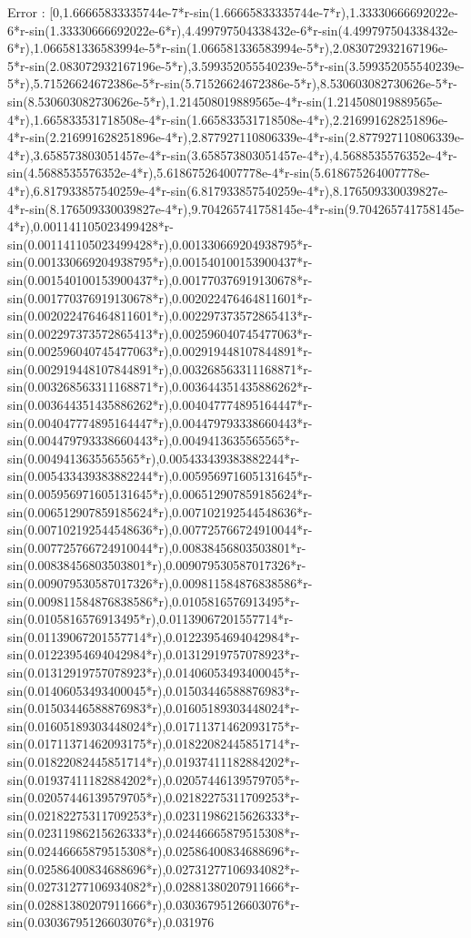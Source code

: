 \documentclass[a4paper,10pt]{article}
\begin{document}
\begin{eulernotebook}
\begin{eulercomment}
\begin{eulercomment}
\begin{eulercomment}
\begin{eulercomment}
\begin{eulercomment}
\begin{eulercomment}
\begin{eulercomment}
\begin{eulercomment}
\begin{eulercomment}
\begin{eulercomment}
\begin{eulercomment}
\begin{eulercomment}
\begin{eulercomment}
\begin{eulercomment}
\begin{eulercomment}
\begin{eulercomment}
\begin{eulercomment}
\begin{eulercomment}
\begin{eulercomment}
\begin{eulercomment}
\begin{euleroutput}
  Error : [0,1.66665833335744e-7*r-sin(1.66665833335744e-7*r),1.33330666692022e-6*r-sin(1.33330666692022e-6*r),4.499797504338432e-6*r-sin(4.499797504338432e-6*r),1.066581336583994e-5*r-sin(1.066581336583994e-5*r),2.083072932167196e-5*r-sin(2.083072932167196e-5*r),3.599352055540239e-5*r-sin(3.599352055540239e-5*r),5.71526624672386e-5*r-sin(5.71526624672386e-5*r),8.530603082730626e-5*r-sin(8.530603082730626e-5*r),1.214508019889565e-4*r-sin(1.214508019889565e-4*r),1.665833531718508e-4*r-sin(1.665833531718508e-4*r),2.216991628251896e-4*r-sin(2.216991628251896e-4*r),2.877927110806339e-4*r-sin(2.877927110806339e-4*r),3.658573803051457e-4*r-sin(3.658573803051457e-4*r),4.5688535576352e-4*r-sin(4.5688535576352e-4*r),5.618675264007778e-4*r-sin(5.618675264007778e-4*r),6.817933857540259e-4*r-sin(6.817933857540259e-4*r),8.176509330039827e-4*r-sin(8.176509330039827e-4*r),9.704265741758145e-4*r-sin(9.704265741758145e-4*r),0.001141105023499428*r-sin(0.001141105023499428*r),0.001330669204938795*r-sin(0.001330669204938795*r),0.001540100153900437*r-sin(0.001540100153900437*r),0.001770376919130678*r-sin(0.001770376919130678*r),0.002022476464811601*r-sin(0.002022476464811601*r),0.002297373572865413*r-sin(0.002297373572865413*r),0.002596040745477063*r-sin(0.002596040745477063*r),0.002919448107844891*r-sin(0.002919448107844891*r),0.003268563311168871*r-sin(0.003268563311168871*r),0.003644351435886262*r-sin(0.003644351435886262*r),0.004047774895164447*r-sin(0.004047774895164447*r),0.004479793338660443*r-sin(0.004479793338660443*r),0.0049413635565565*r-sin(0.0049413635565565*r),0.005433439383882244*r-sin(0.005433439383882244*r),0.005956971605131645*r-sin(0.005956971605131645*r),0.006512907859185624*r-sin(0.006512907859185624*r),0.007102192544548636*r-sin(0.007102192544548636*r),0.007725766724910044*r-sin(0.007725766724910044*r),0.00838456803503801*r-sin(0.00838456803503801*r),0.009079530587017326*r-sin(0.009079530587017326*r),0.009811584876838586*r-sin(0.009811584876838586*r),0.0105816576913495*r-sin(0.0105816576913495*r),0.01139067201557714*r-sin(0.01139067201557714*r),0.01223954694042984*r-sin(0.01223954694042984*r),0.01312919757078923*r-sin(0.01312919757078923*r),0.01406053493400045*r-sin(0.01406053493400045*r),0.01503446588876983*r-sin(0.01503446588876983*r),0.01605189303448024*r-sin(0.01605189303448024*r),0.01711371462093175*r-sin(0.01711371462093175*r),0.01822082445851714*r-sin(0.01822082445851714*r),0.01937411182884202*r-sin(0.01937411182884202*r),0.02057446139579705*r-sin(0.02057446139579705*r),0.02182275311709253*r-sin(0.02182275311709253*r),0.02311986215626333*r-sin(0.02311986215626333*r),0.02446665879515308*r-sin(0.02446665879515308*r),0.02586400834688696*r-sin(0.02586400834688696*r),0.02731277106934082*r-sin(0.02731277106934082*r),0.02881380207911666*r-sin(0.02881380207911666*r),0.03036795126603076*r-sin(0.03036795126603076*r),0.031976
\end{euleroutput}
\end{eulercomment}
\end{eulercomment}
\end{eulercomment}
\end{eulercomment}
\end{eulercomment}
\end{eulercomment}
\end{eulercomment}
\end{eulercomment}
\end{eulercomment}
\end{eulercomment}
\end{eulercomment}
\end{eulercomment}
\end{eulercomment}
\end{eulercomment}
\end{eulercomment}
\end{eulercomment}
\end{eulercomment}
\end{eulercomment}
\end{eulercomment}
\end{eulercomment}
\end{eulernotebook}
\end{document}
